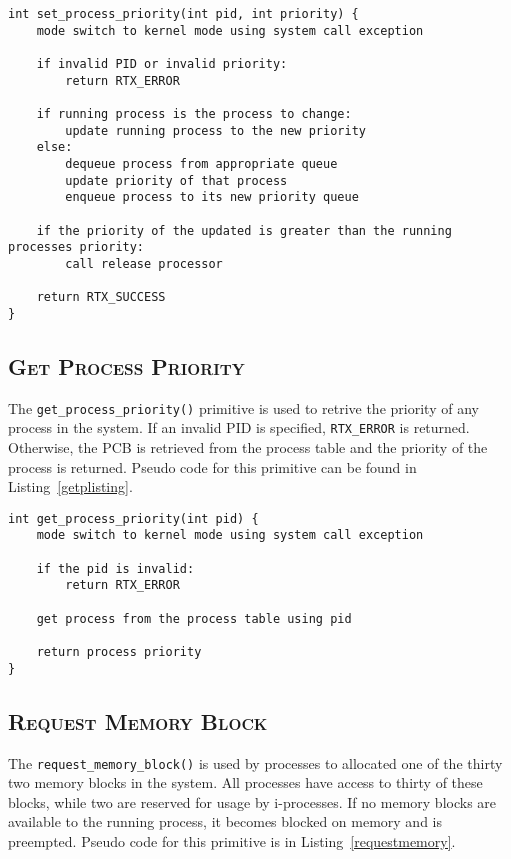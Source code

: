 \documentclass[oneside]{report}
\begin{document}
\begin{lstlisting}
int set_process_priority(int pid, int priority) {
    mode switch to kernel mode using system call exception
    
    if invalid PID or invalid priority:
        return RTX_ERROR
    
    if running process is the process to change:
        update running process to the new priority
    else:
        dequeue process from appropriate queue
        update priority of that process
        enqueue process to its new priority queue

    if the priority of the updated is greater than the running processes priority:
        call release processor

    return RTX_SUCCESS
}
\end{lstlisting}

\subsection{\textsc{Get Process Priority}}
The \texttt{get\_process\_priority()} primitive is used to retrive the
priority of any process in the system. If an invalid PID is specified,
\texttt{RTX\_ERROR} is returned. Otherwise, the PCB is retrieved from
the process table and the priority of the process is returned. Pseudo
code for this primitive can be found in Listing~\ref{getplisting}.

\begin{lstlisting}
int get_process_priority(int pid) {
    mode switch to kernel mode using system call exception
    
    if the pid is invalid:
        return RTX_ERROR

    get process from the process table using pid
    
    return process priority
}
\end{lstlisting}

\subsection{\textsc{Request Memory Block}}

The \texttt{request\_memory\_block()} is used by processes to
allocated one of the thirty two memory blocks in the system. All
processes have access to thirty of these blocks, while two are
reserved for usage by i-processes. If no memory blocks are available
to the running process, it becomes blocked on memory and is
preempted. Pseudo code for this primitive is in
Listing~\ref{requestmemory}.
\end{document}
